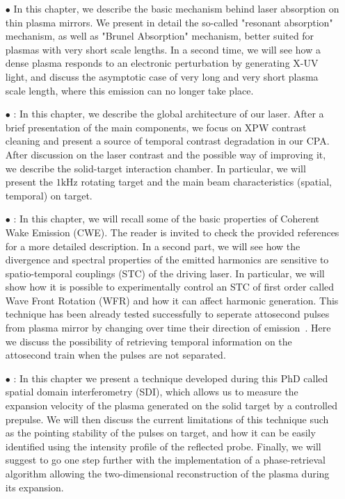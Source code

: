\begin{itemize}
\item[$\bullet$]   In this chapter, we describe the basic mechanism behind laser absorption on thin plasma mirrors. We present in detail the so-called "resonant absorption" mechanism, as well as "Brunel Absorption" mechanism, better suited for plasmas with very short scale lengths. In a second time, we will see how a dense plasma responds to an electronic perturbation by generating X-UV light, and discuss the asymptotic case of very long and very short plasma scale length, where this emission can no longer take place. 

\item[$\bullet$]  : In this chapter, we describe the global architecture of our laser. After a brief presentation of the main components, we focus on XPW contrast cleaning and present a source of temporal contrast degradation in our CPA. After discussion on the laser contrast and the possible way of improving it, we describe the solid-target interaction chamber. In particular, we will present the $1 \mathrm{kHz}$ rotating target and the main beam characteristics (spatial, temporal) on target.


\item[$\bullet$]  : In this chapter, we will recall some of the basic properties of Coherent Wake Emission (CWE). The reader is invited to check the provided references for a more detailed description. In a second part, we will see how the divergence and spectral properties of the emitted harmonics are sensitive to spatio-temporal couplings (STC) of the driving laser. In particular, we will show how it is possible to experimentally control an STC of first order called Wave Front Rotation (WFR) and how it can affect harmonic generation. This technique has been already tested successfully to seperate attosecond pulses from plasma mirror by changing over time their direction of emission~\cite{Wheeler2012}. Here we discuss the possibility of retrieving temporal information on the attosecond train when the pulses are not separated.  


\item[$\bullet$] : In this chapter we present a technique developed during this PhD called spatial domain interferometry (SDI), which allows us  to measure the expansion velocity of the plasma generated on the solid target by a controlled prepulse. We will then discuss the current limitations of this technique such as the pointing stability of the pulses on target, and how it can be easily identified using the intensity profile of the reflected probe. Finally, we will suggest to go one step further with the implementation of a phase-retrieval algorithm allowing the two-dimensional reconstruction of the plasma during its expansion.



\end{itemize}
